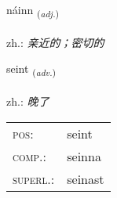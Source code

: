 \documentclass[frontgrid, backgrid]{flacards}\usepackage[]{graphicx}\usepackage[]{xcolor}
\begin{document}
\renewcommand{\flhead}{\vskip5pt \fboxsep=0pt {\small\bfseries\footnotesize Lýsingarorð | 形容词}}
\renewcommand{\fcfoot}{\vskip5pt \fboxsep=0pt \hspace{2pt}{\small\bfseries\footnotesize 1K}}

\renewcommand{\blhead}{\vskip5pt {\small\bfseries\footnotesize Lýsingarorð | 形容词 }}
\renewcommand{\bcfoot}{\vskip5pt \hspace{2pt}{\small\bfseries\footnotesize 1K}}


{náinn \small{\textsubscript{(\textit{adj.})}} \\[1ex] %
\textphonetic{[nauːɪn]} \\
zh.: \emph{亲近的；密切的} \\  [2ex]
\renewcommand*{\arraystretch}{0.8}
}

\renewcommand{\flhead}{\vskip5pt \fboxsep=0pt {\small\bfseries\footnotesize Atviksorð | 副词}}
\renewcommand{\fcfoot}{\vskip5pt \fboxsep=0pt \hspace{2pt}{\small\bfseries\footnotesize 1K}}

\renewcommand{\blhead}{\vskip5pt {\small\bfseries\footnotesize Atviksorð | 副词 }}
\renewcommand{\bcfoot}{\vskip5pt \hspace{2pt}{\small\bfseries\footnotesize 1K}}


{seint \small{\textsubscript{(\textit{adv.})}} \\[1ex] %
\textphonetic{[sein̥t]} \\
zh.: \emph{晚了} \\  [2ex]
\renewcommand*{\arraystretch}{0.8}
\begin{tabular}{ll}
\textsc{pos}: & seint \\ 
\textsc{comp.}: & seinna \\ 
\textsc{superl.}: & seinast \\
\end{tabular}
}
\end{document}
